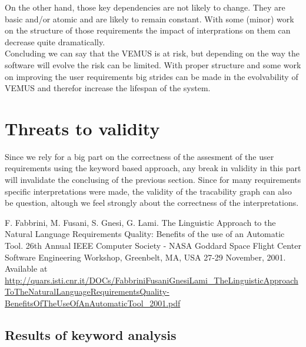 \documentclass[a4paper,twoside,11pt]{article}
\begin{document}
On the other hand, those key dependencies are not likely to change. They are basic and/or atomic and are likely to remain constant. With some (minor) work on the structure of those requirements the impact of interprations on them can decrease quite dramatically. \\

Concluding we can say that the VEMUS is at risk, but depending on the way the software will evolve the risk can be limited. With proper structure and some work on improving the user requirements big strides can be made in the evolvability of VEMUS and therefor increase the lifespan of the system.


\section{Threats to validity}
Since we rely for a big part on the correctness of the assesment of the user requirements using the keyword based approach, any break in validity in this part will invalidate the conclusing of the previous section. Since for many requirements specific interpretations were made, the validity of the tracability graph can also be question, altough we feel strongly about the correctness of the interpretations.

\begin{thebibliography}{9}
F. Fabbrini, M. Fusani, S. Gnesi, G. Lami. The Linguistic Approach to the Natural Language Requirements Quality: Benefits of the use of an Automatic Tool. 26th Annual IEEE Computer Society - NASA Goddard Space Flight Center Software Engineering Workshop, Greenbelt, MA, USA 27-29 November, 2001. Available at \url{http://quars.isti.cnr.it/DOCs/FabbriniFusaniGnesiLami\_TheLinguisticApproachToTheNaturalLanguageRequirementsQuality-BenefitsOfTheUseOfAnAutomaticTool\_2001.pdf}
 \end{thebibliography}

\newpage
\begin{appendices}
\section{Results of keyword analysis} \label{appendix:analysis}

\noindent	
\end{appendices}
\end{document}
